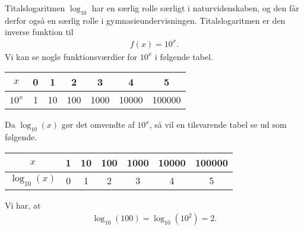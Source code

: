 Titalslogaritmen $\log_{10}$ har en særlig rolle særligt i naturvidenskaben, og den får derfor også en særlig rolle i gymnasieundervisningen. Titalslogaritmen er den inverse funktion til 
\begin{align*}
	f(x) = 10^x.
\end{align*}
Vi kan se nogle funktionsværdier for $10^x$ i følgende tabel.
\begin{table}[H]
	\centering
	\begin{tabular}{c|c|c|c|c|c|c}
		$x$ & 0 & 1 & 2 & 3 & 4 & 5\\
		\hline
		$10^x$ & 1 & 10 & 100 & 1000 & 10000 & 100000
	\end{tabular}
\end{table}
Da $\log_{10}(x)$ gør det omvendte af $10^x$, så vil en tilsvarende tabel se ud som følgende.
\begin{table}[H]
	\centering
	\begin{tabular}{c|c|c|c|c|c|c}
		$x$ & 1 & 10 & 100 & 1000 & 10000 & 100000 \\
		\hline
		$\log_{10}(x)$ & 0 & 1 & 2 & 3 & 4 & 5
	\end{tabular}
\end{table}

\begin{exa}
	Vi har, at 
	\begin{align*}
		\log_{10}(100) = \log_{10}(10^2) = 2.
	\end{align*}
\end{exa}

